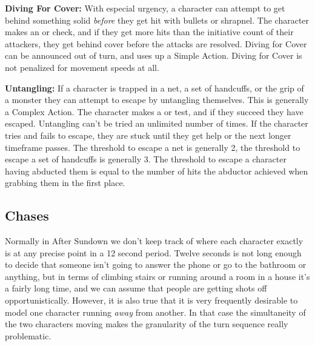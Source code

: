 \textbf{Diving For Cover:} With especial urgency, a character can attempt to get behind something solid \textit{before} they get hit with bullets or shrapnel. The character makes an  or  check, and if they get more hits than the initiative count of their attackers, they get behind cover before the attacks are resolved. Diving for Cover can be announced out of turn, and uses up a Simple Action. Diving for Cover is not penalized for movement speeds at all.

\textbf{Untangling:} If a character is trapped in a net, a set of handcuffs, or the grip of a monster they can attempt to escape by untangling themselves. This is generally a Complex Action. The character makes a  or  test, and if they succeed they have escaped. Untangling can't be tried an unlimited number of times. If the character tries and fails to escape, they are stuck until they get help or the next longer timeframe passes. The threshold to escape a net is generally 2, the threshold to escape a set of handcuffs is generally 3. The threshold to escape a character having abducted them is equal to the number of hits the abductor achieved when grabbing them in the first place.

\subsection{Chases} 

Normally in After Sundown we don't keep track of where each character exactly is at any precise point in a 12 second period. Twelve seconds is not long enough to decide that someone isn't going to answer the phone or go to the bathroom or anything, but in terms of climbing stairs or running around a room in a house it's a fairly long time, and we can assume that people are getting shots off opportunistically. However, it is also true that it is very frequently desirable to model one character running \textit{away} from another. In that case the simultaneity of the two characters moving makes the granularity of the turn sequence really problematic.

